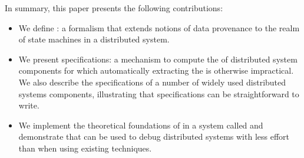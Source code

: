 In summary, this paper presents the following contributions:
\begin{itemize}
  \item
    We define \watprovenance{}: a formalism that extends notions of data
    provenance to the realm of state machines in a distributed system.
  \item
    We present \watprovenance{} specifications: a mechanism to compute the
    \watprovenance{} of distributed system components for which automatically
    extracting the \watprovenance{} is otherwise impractical. We also describe
    the \watprovenance{} specifications of a number of widely used distributed
    systems components, illustrating that \watprovenance{} specifications can
    be straightforward to write.
  \item
    We implement the theoretical foundations of \watprovenance{} in a system
    called \fluent{} and demonstrate that \fluent{} can be used to debug
    distributed systems with less effort than when using existing techniques.
\end{itemize}
